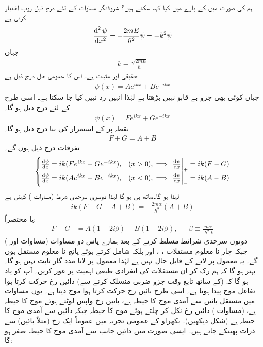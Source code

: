 ہم   کی صورت میں  کے بارے میں کیا کہہ سکتے ہیں؟ شروڈنگر مساوات  کے لئے  درج ذیل روپ اختیار کرتی ہے
\begin{align*}
\frac{\dif^{\,2}\psi}{\dif x^2}=-\frac{2mE}{\hslash^2}\psi=-k^2\psi
\end{align*}
 جہاں
\begin{align}\label{مساوات_شروڈنگر_مستقل_کے}
k\equiv\frac{\sqrt{2mE}}{\hslash}
\end{align}
 حقیقی اور مثبت ہے۔ اس کا عمومی حل  درج ذیل ہے
\begin{align}\label{مساوات_شروڈنگر_بایاں_حل_ڈیلٹا}
\psi(x)=Ae^{ikx}+Be^{-ikx}
\end{align}
جہاں کوئی بھی جزو بے قابو نہیں بڑھتا ہے لہٰذا انہیں رد نہیں کیا جا سکتا ہے۔ اسی طرح  کے لئے درج ذیل ہو گا۔
\begin{align}\label{مساوات_شروڈنگر_دایاں_حل_ڈیلٹا}
\psi(x)=Fe^{ikx}+Ge^{-ikx}
\end{align}
نقطہ  پر  کے استمرار کی بنا درج ذیل ہو گا۔
\begin{align}\label{مساوات_شروڈنگر_شرط_اول}
F+G=A+B
\end{align}
تفرقات درج ذیل ہوں گے۔
\begin{align*}
\begin{cases}
\frac{\dif\psi}{\dif x}=ik(Fe^{ikx}-Ge^{-ikx}),& (x>0),\implies \left.\frac{\dif\psi}{\dif x}\right|_{+}=ik(F-G)\\
\frac{\dif\psi}{\dif x}=ik(Ae^{ikx}-Be^{-ikx}),& (x<0),\implies \left.\frac{\dif\psi}{\dif x}\right|_{-}=ik(A-B)
\end{cases}
\end{align*}
لہٰذا  ہو گا۔ساتھ ہی  ہو گا لہٰذا دوسری سرحدی شرط (مساوات ) کہتی ہے
\begin{align}
ik(F-G-A+B)=-\frac{2m\alpha}{\hslash^2}(A+B)
\end{align}
یا مختصراً:
\begin{align}\label{مساوات_شروڈنگر_شرط_دوم}
F-G&=A(1+2i\beta)-B(1-2i\beta),&&\beta\equiv\frac{m\alpha}{\hslash^2 k}
\end{align}
دونوں سرحدی شرائط مسلط کرنے کے بعد ہمارے پاس دو مساوات (مساوات  اور ) جبکہ چار نا معلوم مستقلات ، ،  اور  بلکہ  شامل کرتے ہوئے پانچ نا معلوم مستقل ہوں گے۔ یہ معمول پر لانے کے قابل حال نہیں ہے لہٰذا معمول پر لانا مدد گار ثابت نہیں ہو گا۔ بہتر ہو گا کہ ہم رک کر ان  مستقلات کی انفرادی طبعی اہمیت پر غور کریں۔  آپ کو یاد ہو گا کہ  (کے ساتھ  تابع وقت جزو ضربی  منسلک کرنے سے) دائیں رخ حرکت کرتا ہوا تفاعل موج پیدا ہوتا ہے۔ اسی طرح  بائیں رخ حرکت کرتا ہوا موج دیتا ہے۔ یوں مساوات  میں مستقل  بائیں سے آمدی موج کا حیطہ ہے،  بائیں رخ واپس لوٹتے ہوئے موج کا حیطہ ہے،  (مساوات ) دائیں رخ نکل کر چلتے ہوئے موج کا حیطہ  جبکہ  دائیں سے آمدی موج کا حیطہ ہے (شکل   دیکھیں)۔ بکھراو کے عمومی تجربہ میں عموماً ایک رخ (مثلاً بائیں) سے ذرات پھینکے جاتے ہیں۔ ایسی صورت میں دائیں جانب سے آمدی موج کا حیطہ صفر ہو گا:
